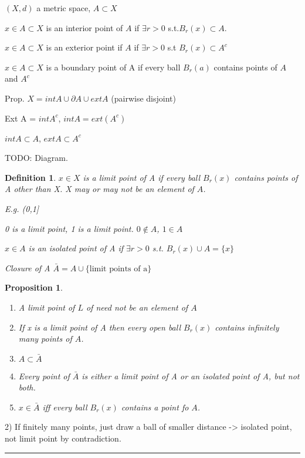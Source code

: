 \documentclass[twoside]{article}
\newtheorem{proposition}[theorem]{Proposition}
\newtheorem{definition}[theorem]{Definition}
\newenvironment{proof}{{\bf Proof:}}{\hfill\rule{2mm}{2mm}}
\begin{document}
$(X,d) $ a metric space, $A \subset X$

$x \in A \subset X$ is an interior point of $A$ if $\exists r > 0$ s.t.$B_r(x) \subset A$.

$x \in A \subset X$ is an exterior point if $A$ if $\exists r > 0$ s.t $B_r(x) \subset A^c$

$x \in A \subset X$ is a boundary point of A if every ball $B_r(a)$ contains points of $A$ and $A^c$

Prop. $X = int A \cup \partial A \cup ext A$ (pairwise disjoint)

Ext A = $int A^c$, $int A = ext(A^c)$

$int A \subset A$, $ext A \subset A^c$

TODO: Diagram. 

\begin{definition}
    $x \in X$ is a limit point of A if every ball $B_r(x)$ contains points of A other than X.
    X may or may not be an element of $A$. 

    E.g. (0,1]

    0 is a limit point, 1 is a limit point. 
    $0 \not\in A$, $1 \in A$

    $x \in A$ is an isolated point of A if $\exists r > 0$ s.t. $B_r(x) \cup A = \{x\}$

    Closure of A $\bar A = A \cup \{\text{limit points of a}\}$
\end{definition}

\begin{proposition}

    \begin{enumerate}

        \item A limit point of $L$ of need not be an element of $A$
        \item If x is a limit point of A then every open ball $B_r(x)$ contains infinitely many points of $A$. 
        \item $A \subset \bar A$ 
        \item Every point of $\bar A$ is either a limit point of A or an isolated point of A, but not both. 
        \item $x \in \bar A$ iff every ball $B_r(x)$ contains a point fo $A$.  
    \end{enumerate}   
\end{proposition}

\begin{proof}
   2) If finitely many points, just draw a ball of smaller distance -> isolated point, not limit point by contradiction. 
\end{proof}
\end{document}
